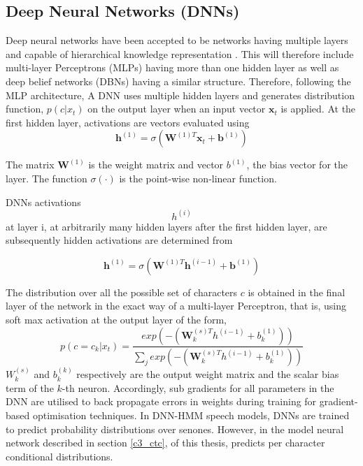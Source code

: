 \subsection{Deep Neural Networks (DNNs)}

Deep neural networks have been accepted to be networks having multiple layers and capable of hierarchical knowledge representation \citep{yu2016automatic}.
 This will therefore include multi-layer Perceptrons (MLPs) having more than one hidden layer \citep{dahl2012context} as well as deep belief networks (DBNs)\citep{mohamed2009deep,yu2010roles} having a similar structure.  Therefore, following the MLP architecture, A DNN uses multiple hidden layers and generates distribution function, $p(c|x_t)$ on the output layer when an input vector $\mathbf{x}_t$ is applied.  At the first hidden layer, activations are vectors evaluated using
\begin{equation}\mathbf{h}^{(1)}=\sigma(\mathbf{W}^{(1)T}\mathbf{x}_t+\mathbf{b}^{(1)})
\label{eqn_c3_dnn01}\end{equation}

The matrix $\mathbf{W}^{(1)}$ is the weight matrix and vector $b^{(1)}$, the bias vector for the layer.  The function $\sigma(\cdot)$ is the point-wise non-linear function.

DNNs activations  $$h^{(i)}$$ at layer i, at arbitrarily many hidden layers after the first hidden layer, are subsequently hidden activations are determined from

\begin{equation}\mathbf{h}^{(1)}=\sigma(\mathbf{W}^{(1)T}\mathbf{h}^{(i-1)}+\mathbf{b}^{(1)})
\label{eqn_c3_dnn02}\end{equation}

The distribution over all the possible set of characters $c$ is obtained in the final layer of the network in the exact way of a multi-layer Perceptron, that is, using soft max activation at the output layer of the form,
\begin{equation}p(c=c_k|x_t)=\frac{exp(-(\mathbf{W}^{(s)T}_kh^{(i-1)}+b_k^{(1)}))}{\sum_j exp(-(\mathbf{W}^{(s)T}_kh^{(i-1)}+b_k^{(1)}))}
\label{eqn_c3_dnn02}\end{equation}
$W_k^{(s)}$ and $b_k^{(k)}$ respectively are the output weight matrix and the scalar bias term of the $k$-th neuron. Accordingly, sub gradients for all parameters in the DNN are utilised to back propagate errors in weights during training for gradient-based optimisation techniques.  In DNN-HMM speech models,   DNNs are trained to predict probability distributions over senones.  However, in the model neural network described in section \ref{c3_ctc}, of this thesis, predicts per character conditional distributions.

